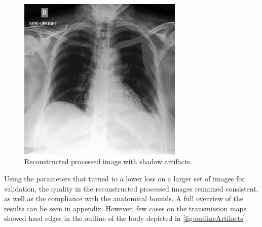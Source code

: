 \documentclass[nomenclature, english, bibtex]{kththesis}
\numberwithin{listing}{chapter}
\begin{document}
\begin{figure}[ht]
    \centering
    \includegraphics[width=0.7\textwidth]{figures/shadowed.png}
    \caption{Reconstructed processed image with shadow artifacts.}
    \label{fig:shadowArtifacts}
\end{figure}

Using the parameters that turned to a lower loss on a larger set of images for validation, the quality in the reconstructed
processed images remained consistent, as well as the compliance with the anatomical bounds. A full overview of the results can
be seen in appendix. However, few cases on the transmission maps showed hard edges in the outline of the body depicted
in \autoref{fig:outlineArtifacts}.
\end{document}
